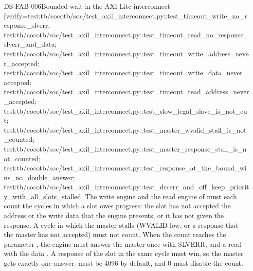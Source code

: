 \begin{requirement}{DS-FAB-006}{Bounded wait in the AXI-Lite interconnect}
[verify={test:tb/cocotb/soc/test_axil_interconnect.py::test_timeout_write_no_response_slverr; test:tb/cocotb/soc/test_axil_interconnect.py::test_timeout_read_no_response_slverr_and_data; test:tb/cocotb/soc/test_axil_interconnect.py::test_timeout_write_address_never_accepted; test:tb/cocotb/soc/test_axil_interconnect.py::test_timeout_write_data_never_accepted; test:tb/cocotb/soc/test_axil_interconnect.py::test_timeout_read_address_never_accepted; test:tb/cocotb/soc/test_axil_interconnect.py::test_slow_legal_slave_is_not_cut; test:tb/cocotb/soc/test_axil_interconnect.py::test_master_wvalid_stall_is_not_counted; test:tb/cocotb/soc/test_axil_interconnect.py::test_master_response_stall_is_not_counted; test:tb/cocotb/soc/test_axil_interconnect.py::test_response_at_the_bound_wins_no_double_answer; test:tb/cocotb/soc/test_axil_interconnect.py::test_decerr_and_off_keep_priority_with_all_slots_stalled}]
The write engine and the read engine of  must each count the cycles in which a slot owes progress: the slot has not accepted the address or the write data that the engine presents, or it has not given the response. A cycle in which the master stalls (WVALID low, or a response that the master has not accepted) must not count. When the count reaches the parameter , the engine must answer the master once with SLVERR, and a read with the data . A response of the slot in the same cycle must win, so the master gets exactly one answer.  must be 4096 by default, and 0 must disable the count.
\end{requirement}

